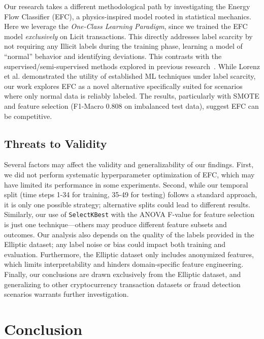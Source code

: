 \documentclass[12pt]{article}
\begin{document}
Our research takes a different methodological path by investigating the Energy Flow Classifier (EFC), a physics-inspired
model rooted in statistical mechanics. Here we leverage the  \emph{One-Class Learning Paradigm}, since we trained the EFC
model \textit{exclusively} on Licit transactions. This directly addresses label scarcity by not requiring any Illicit labels
during the training phase, learning a model of ``normal'' behavior and identifying deviations. This contrasts with the
supervised/semi-supervised methods explored in previous research~\cite{lorenz2021machinelearningmethodsdetect}.
While Lorenz et al. demonstrated the utility of established ML techniques under label scarcity, our work explores EFC as
a novel alternative specifically suited for scenarios where only normal data is reliably labeled. The results, particularly
with SMOTE and feature selection (F1-Macro 0.808 on imbalanced test data), suggest EFC can be competitive. 

\subsection{Threats to Validity}\label{sec:threats}

Several factors may affect the validity and generalizability of our findings. First, we did not perform systematic hyperparameter
optimization of EFC, which may have limited its performance in some experiments. Second, while our temporal split (time
steps 1-34 for training, 35-49 for testing) follows a standard approach, it is only one possible strategy; alternative
splits could lead to different results. Similarly, our use of \texttt{SelectKBest} with the ANOVA F-value for feature
selection is just one technique---others may produce different feature subsets and outcomes. Our analysis also depends on
the quality of the labels provided in the Elliptic dataset; any label noise or bias could impact both training and evaluation.
Furthermore, the Elliptic dataset only includes anonymized features, which limits interpretability and hinders domain-specific
feature engineering. Finally, our conclusions are drawn exclusively from the Elliptic dataset, and generalizing to other
cryptocurrency transaction datasets or fraud detection scenarios warrants further investigation.

\section{Conclusion} \label{section:conclusion}
\end{document}
